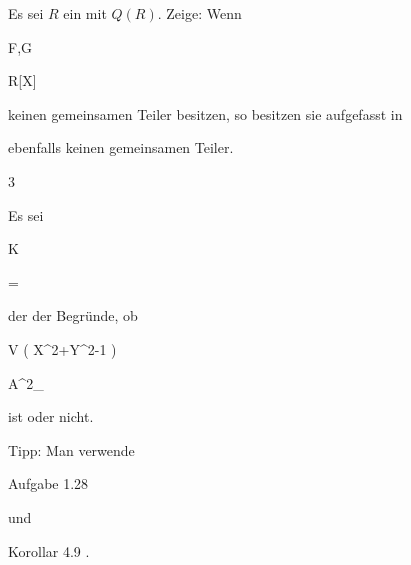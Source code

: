 {


Es sei $R$ ein
mit
$Q(R)$. Zeige: Wenn


\mavergleichskette


{\vergleichskette


{ F,G
}


{ \in }{ R[X]
}


{  }{
}


{    }{
}


{   }{
}


}
{}{}{}
keinen gemeinsamen
 {} {}
Teiler besitzen, so besitzen sie aufgefasst in


 ebenfalls keinen gemeinsamen Teiler.


}


{ {} {}} {}




{3}


{


Es sei


\mavergleichskette


{\vergleichskette


{ K
}


{ = }{ \Q
}


{  }{
}


{    }{
}


{   }{
}


}
{}{}{}
der
der
Begründe, ob


\mavergleichskettedisp


{\vergleichskette


{ V \left(  X^2+Y^2-1  \right)
}


{ \subseteq} { {\mathbb A}^{2}_{\Q}
}


{ } {
}


{ } {
}


{ } {
}


}
{}{}{}
ist oder nicht.


}


{} {Tipp: Man verwende

Aufgabe 1.28

und

Korollar 4.9
.}




